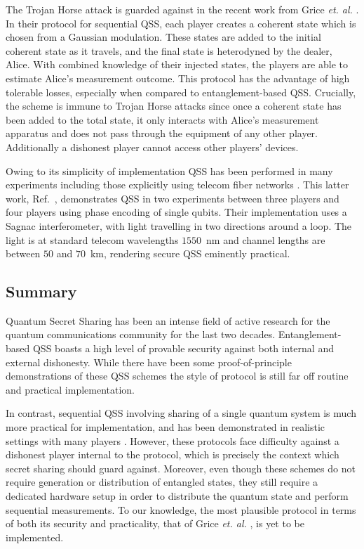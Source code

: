 The Trojan Horse attack is guarded against in the recent work from Grice \emph{et. al.} \cite{Grice2019}. In their protocol for sequential QSS, each player creates a coherent state which is chosen from a Gaussian modulation. These states are added to the initial coherent state as it travels, and the final state is heterodyned by the dealer, Alice. With combined knowledge of their injected states, the players are able to estimate Alice's measurement outcome. This protocol has the advantage of high tolerable losses, especially when compared to entanglement-based QSS. Crucially, the scheme is immune to Trojan Horse attacks since once a coherent state has been added to the total state, it only interacts with Alice's measurement apparatus and does not pass through the equipment of any other player. Additionally a dishonest player cannot access other players' devices.

Owing to its simplicity of implementation QSS has been performed in many experiments \cite{Schmid2005, Hai-Qiang2013a} including those explicitly using telecom fiber networks \cite{Bogdanski2009}. This latter work, Ref.~\cite{Bogdanski2009}, demonstrates QSS in two experiments between three players and four players using phase encoding of single qubits. Their implementation uses a Sagnac interferometer, with light travelling in two directions around a loop. The light is at standard telecom wavelengths $1550$~nm and channel lengths are between $50$ and $70$~km, rendering secure QSS eminently practical.


\subsection{Summary}
Quantum Secret Sharing has been an intense field of active research for the quantum communications community for the last two decades. Entanglement-based QSS boasts a high level of provable security against both internal and external dishonesty. While there have been some proof-of-principle demonstrations of these QSS schemes \cite{Gartner2007, Bell2014, Tittel2001, Chen2005b} the style of protocol is still far off routine and practical implementation.

In contrast, sequential QSS involving sharing of a single quantum system is much more practical for implementation, and has been demonstrated in realistic settings with many players \cite{Schmid2005, Bogdanski2009, Hai-Qiang2013a}. However, these protocols face difficulty against a dishonest player internal to the protocol, which is precisely the context which secret sharing should guard against. Moreover, even though these schemes do not require generation or distribution of entangled states, they still require a dedicated hardware setup in order to distribute the quantum state and perform sequential measurements. To our knowledge, the most plausible protocol in terms of both its security and practicality, that of Grice \emph{et. al.} \cite{Grice2019}, is yet to be implemented. 

